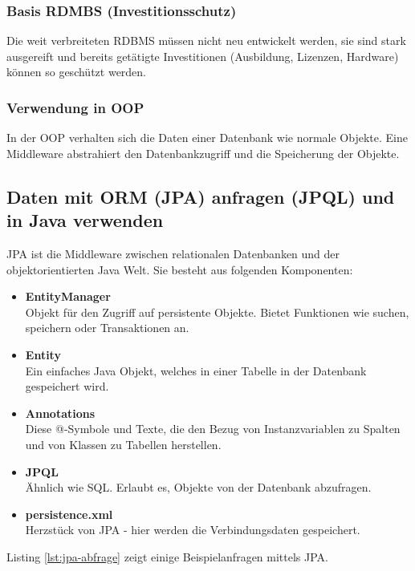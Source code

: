 \subsubsection{Basis RDMBS (Investitionsschutz)}
Die weit verbreiteten RDBMS müssen nicht neu entwickelt werden, sie sind stark ausgereift und bereits getätigte Investitionen (Ausbildung, Lizenzen, Hardware) können so geschützt werden.

\subsubsection{Verwendung in OOP}
In der OOP verhalten sich die Daten einer Datenbank wie normale Objekte. Eine Middleware abstrahiert den Datenbankzugriff und die Speicherung der Objekte.

\subsection{Daten mit ORM (JPA) anfragen (JPQL) und in Java verwenden}

\ac{JPA} ist die Middleware zwischen relationalen Datenbanken und der objektorientierten Java Welt. Sie besteht aus folgenden Komponenten:

\begin{itemize}
  \item \textbf{EntityManager} \\
  Objekt für den Zugriff auf persistente Objekte. Bietet Funktionen wie suchen, speichern oder Transaktionen an.
  \item \textbf{Entity} \\
  Ein einfaches Java Objekt, welches in einer Tabelle in der Datenbank gespeichert wird.
  \item \textbf{Annotations} \\
  Diese @-Symbole und Texte, die den Bezug von Instanzvariablen zu Spalten und von Klassen zu Tabellen herstellen.
  \item \textbf{JPQL}  \\
  Ähnlich wie SQL. Erlaubt es, Objekte von der Datenbank abzufragen.
  \item \textbf{persistence.xml} \\
  Herzstück von JPA - hier werden die Verbindungsdaten gespeichert.
\end{itemize}

\newpage

Listing \ref{lst:jpa-abfrage} zeigt einige Beispielanfragen mittels JPA.

